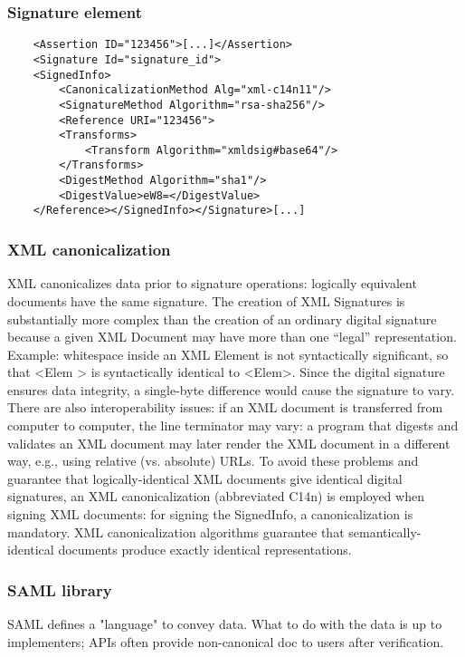 \documentclass[a4paper, 10pt, titlepage]{article}
\begin{document}
\subsubsection*{Signature element}
\begin{lstlisting}
	<Assertion ID="123456">[...]</Assertion>
	<Signature Id="signature_id">
	<SignedInfo>
		<CanonicalizationMethod Alg="xml-c14n11"/>
		<SignatureMethod Algorithm="rsa-sha256"/>
		<Reference URI="123456">
		<Transforms>
			<Transform Algorithm="xmldsig#base64"/>
		</Transforms>
		<DigestMethod Algorithm="sha1"/>
		<DigestValue>eW8=</DigestValue>
	</Reference></SignedInfo></Signature>[...]
\end{lstlisting}

\subsubsection{XML canonicalization}
XML canonicalizes data prior to signature operations: logically equivalent documents have the same signature. The creation of XML Signatures is substantially more complex than the creation of an ordinary digital signature because a given XML Document may have more than one “legal” representation. Example: whitespace inside an XML Element is not syntactically significant, so that <Elem > is syntactically identical to <Elem>. Since the digital signature ensures data integrity, a single-byte difference would cause the
signature to vary. 
There are also interoperability issues: if an XML document is transferred from computer to computer, the line terminator may vary: a program that digests and validates an XML document may later render the XML document in a different way, e.g., using relative (vs. absolute) URLs. To avoid these problems and guarantee that logically-identical XML documents give identical digital signatures, an XML canonicalization (abbreviated C14n) is employed when signing XML documents: for signing the SignedInfo, a canonicalization is mandatory. XML canonicalization algorithms guarantee that semantically-identical documents produce exactly identical representations.

\subsubsection{SAML library}
SAML defines a "language" to convey data. What to do with the data is up to implementers; APIs often provide non-canonical doc to users after verification. 
\end{document}
